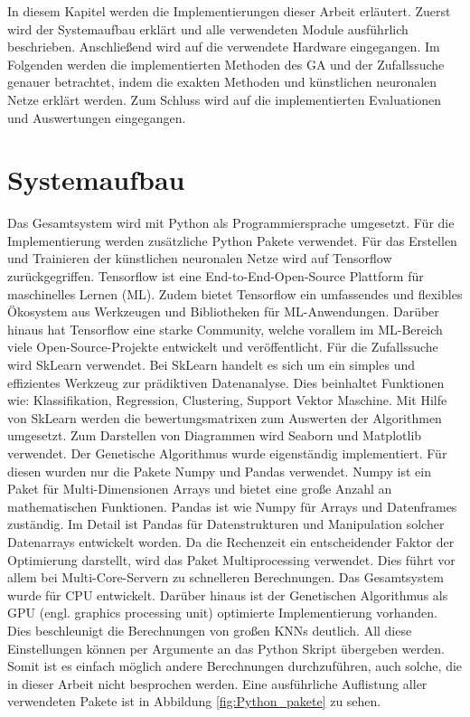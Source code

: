 In diesem Kapitel werden die Implementierungen dieser Arbeit erläutert. Zuerst wird der Systemaufbau erklärt und alle verwendeten Module ausführlich beschrieben. Anschließend wird auf die verwendete Hardware eingegangen. Im Folgenden werden die implementierten Methoden des GA und der Zufallssuche genauer betrachtet, indem die exakten Methoden und künstlichen neuronalen Netze erklärt werden. Zum Schluss wird auf die implementierten Evaluationen und Auswertungen eingegangen. 

\section{Systemaufbau}
Das Gesamtsystem wird mit Python als Programmiersprache umgesetzt. Für die Implementierung werden zusätzliche Python Pakete verwendet. 
Für das Erstellen und Trainieren der künstlichen neuronalen Netze wird auf Tensorflow zurückgegriffen. Tensorflow ist eine End-to-End-Open-Source Plattform für maschinelles Lernen (ML). Zudem bietet Tensorflow ein umfassendes und flexibles Ökosystem aus Werkzeugen und Bibliotheken für ML-Anwendungen. Darüber hinaus hat Tensorflow eine starke Community, welche vorallem im ML-Bereich viele Open-Source-Projekte entwickelt und veröffentlicht.
Für die Zufallssuche wird SkLearn verwendet. Bei SkLearn handelt es sich um ein simples und effizientes Werkzeug zur prädiktiven Datenanalyse. Dies beinhaltet Funktionen wie:  Klassifikation, Regression, Clustering, Support Vektor Maschine. Mit Hilfe von SkLearn werden die bewertungsmatrixen zum Auswerten der Algorithmen umgesetzt.
Zum Darstellen von Diagrammen wird Seaborn und Matplotlib verwendet.
Der Genetische Algorithmus wurde eigenständig implementiert. Für diesen wurden nur die Pakete Numpy und Pandas verwendet. Numpy ist ein Paket für Multi-Dimensionen Arrays und bietet eine große Anzahl an mathematischen Funktionen. Pandas ist wie Numpy für Arrays und Datenframes zuständig. Im Detail ist Pandas für Datenstrukturen und Manipulation solcher Datenarrays entwickelt worden.
Da die Rechenzeit ein entscheidender Faktor der Optimierung darstellt, wird das Paket Multiprocessing verwendet. Dies führt vor allem bei Multi-Core-Servern zu schnelleren Berechnungen. Das Gesamtsystem wurde für CPU entwickelt. Darüber hinaus ist der Genetischen Algorithmus als GPU (engl. graphics processing unit) optimierte Implementierung vorhanden. Dies beschleunigt die Berechnungen von großen KNNs deutlich. 
All diese Einstellungen können per Argumente an das Python Skript übergeben werden. Somit ist es einfach möglich andere Berechnungen durchzuführen, auch solche, die in dieser Arbeit nicht besprochen werden. Eine ausführliche Auflistung aller verwendeten Pakete ist in Abbildung \ref{fig:Python_pakete} zu sehen. 

